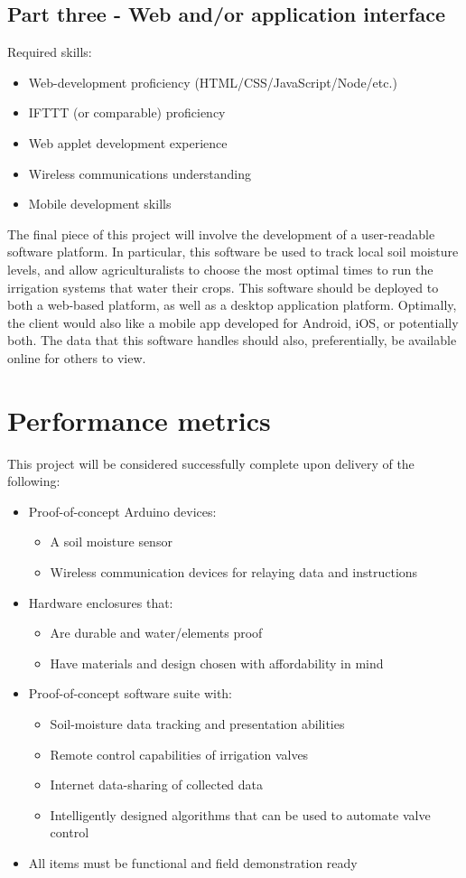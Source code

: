\documentclass[onecolumn, draftclsnofoot,10pt, compsoc]{IEEEtran}
\begin{document}
	\subsection{Part three - Web and/or application interface}
	Required skills:
	\begin{itemize}
		\item Web-development proficiency (HTML/CSS/JavaScript/Node/etc.)
		\item IFTTT (or comparable) proficiency
		\item Web applet development experience
		\item Wireless communications understanding
		\item Mobile development skills
	\end{itemize}
	The final piece of this project will involve the development of a user-readable software platform.
	In particular, this software be used to track local soil moisture levels, and allow agriculturalists to choose the most optimal times to run the irrigation systems that water their crops.
	This software should be deployed to both a web-based platform, as well as a desktop application platform.
	Optimally, the client would also like a mobile app developed for Android, iOS, or potentially both.
	The data that this software handles should also, preferentially, be available online for others to view.
	
	\pagebreak
	\section{Performance metrics}
	This project will be considered successfully complete upon delivery of the following:
	\begin{itemize}
		\item Proof-of-concept Arduino devices:
		\begin{itemize}
			\item A soil moisture sensor
			\item Wireless communication devices for relaying data and instructions
		\end{itemize}
		\item Hardware enclosures that:
		\begin{itemize}
			\item Are durable and water/elements proof
			\item Have materials and design chosen with affordability in mind
		\end{itemize}
		\item Proof-of-concept software suite with:
		\begin{itemize}
			\item Soil-moisture data tracking and presentation abilities
			\item Remote control capabilities of irrigation valves
			\item Internet data-sharing of collected data
			\item Intelligently designed algorithms that can be used to automate valve control        
		\end{itemize}
		\item All items must be functional and field demonstration ready
	\end{itemize}
	\newpage
	
\end{document}
